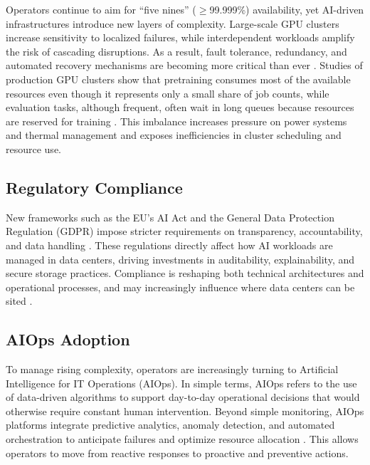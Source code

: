\documentclass[conference]{IEEEtran}
\begin{document}
Operators continue to aim for ``five nines'' ($\geq$99.999\%) availability, yet AI-driven infrastructures introduce new layers of complexity. Large-scale GPU clusters increase sensitivity to localized failures, while interdependent workloads amplify the risk of cascading disruptions. As a result, fault tolerance, redundancy, and automated recovery mechanisms are becoming more critical than ever \cite{Cui2025}. Studies of production GPU clusters show that pretraining consumes most of the available resources even though it represents only a small share of job counts, while evaluation tasks, although frequent, often wait in long queues because resources are reserved for training \cite{Cruzes2026}. This imbalance increases pressure on power systems and thermal management and exposes inefficiencies in cluster scheduling and resource use.

\subsection{Regulatory Compliance}

New frameworks such as the EU's AI Act and the General Data Protection Regulation (GDPR) impose stricter requirements on transparency, accountability, and data handling \cite{Chandra2025}. These regulations directly affect how AI workloads are managed in data centers, driving investments in auditability, explainability, and secure storage practices. Compliance is reshaping both technical architectures and operational processes, and may increasingly influence where data centers can be sited \cite{Cruzes2026}.

\subsection{AIOps Adoption}

To manage rising complexity, operators are increasingly turning to Artificial Intelligence for IT Operations (AIOps). In simple terms, AIOps refers to the use of data-driven algorithms to support day-to-day operational decisions that would otherwise require constant human intervention. Beyond simple monitoring, AIOps platforms integrate predictive analytics, anomaly detection, and automated orchestration to anticipate failures and optimize resource allocation \cite{Cheng2023}. This allows operators to move from reactive responses to proactive and preventive actions.
\end{document}
